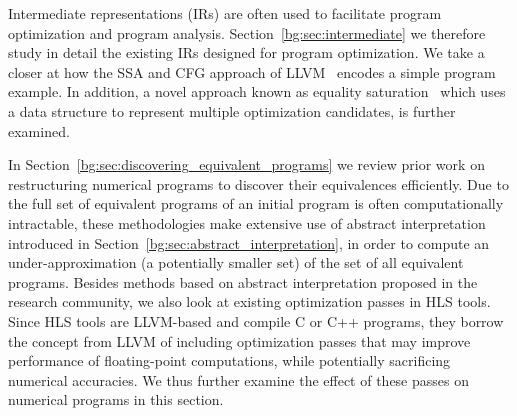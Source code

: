 Intermediate representations (IRs) are often used to facilitate program
optimization and program analysis.  Section~\ref{bg:sec:intermediate} we
therefore study in detail the existing IRs designed for program optimization.
We take a closer at how the SSA and CFG approach of LLVM~\cite{llvm_ir} encodes
a simple program example.  In addition, a novel approach known as equality
saturation~\cite{tate09} which uses a data structure to represent multiple
optimization candidates, is further examined.

In Section~\ref{bg:sec:discovering_equivalent_programs} we review prior work on
restructuring numerical programs to discover their equivalences efficiently.
Due to the full set of equivalent programs of an initial program is often
computationally intractable, these methodologies make extensive use of abstract
interpretation introduced in Section~\ref{bg:sec:abstract_interpretation}, in
order to compute an under-approximation (a potentially smaller set) of the set
of all equivalent programs.  Besides methods based on abstract interpretation
proposed in the research community, we also look at existing optimization
passes in HLS tools.  Since HLS tools are LLVM-based and compile C or C++
programs, they borrow the concept from LLVM of including optimization passes
that may improve performance of floating-point computations, while potentially
sacrificing numerical accuracies.  We thus further examine the effect of these
passes on numerical programs in this section.

